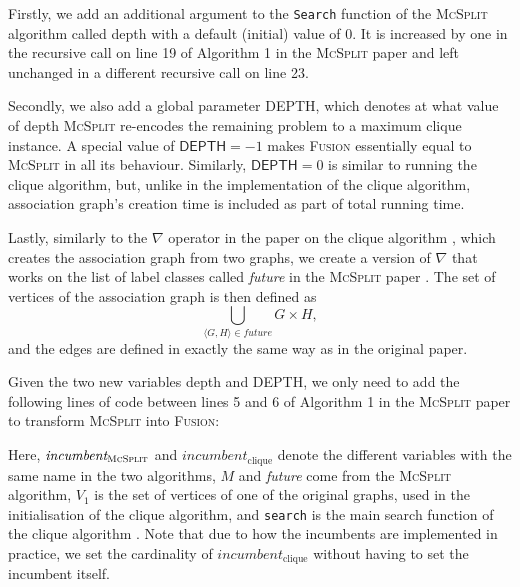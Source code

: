 \documentclass{l4proj}
\theoremstyle{definition}
\theoremstyle{remark}
\begin{document}
Firstly, we add an additional argument to the \texttt{Search} function of the
\textsc{McSplit} algorithm \cite{DBLP:conf/ijcai/McCreeshPT17} called
\textsf{depth} with a default (initial) value of 0. It is increased by one in
the recursive call on line 19 of Algorithm 1 in the \textsc{McSplit} paper
\cite{DBLP:conf/ijcai/McCreeshPT17} and left unchanged in a different recursive
call on line 23.

Secondly, we also add a global parameter \textsf{DEPTH}, which denotes at what value of
\textsf{depth} \textsc{McSplit} re-encodes the remaining problem to a maximum
clique instance. A special value of $\textsf{DEPTH} = -1$ makes \textsc{Fusion}
essentially equal to \textsc{McSplit} in all its behaviour. Similarly,
$\textsf{DEPTH} = 0$ is similar to running the clique algorithm, but, unlike in
the implementation of the clique algorithm, association graph's creation time is
included as part of total running time.

Lastly, similarly to the $\nabla$ operator in the paper on the clique
algorithm \cite{DBLP:conf/cp/McCreeshNPS16}, which creates the association graph
from two graphs, we create a version of $\nabla$ that works on the list of label
classes called \textit{future} in the \textsc{McSplit} paper
\cite{DBLP:conf/ijcai/McCreeshPT17}. The set of vertices of the association
graph is then defined as
\[ \bigcup_{\langle G, H \rangle \in \textit{future}} G \times H, \]
and the edges are defined in exactly the same way as in the original paper.

Given the two new variables \textsf{depth} and \textsf{DEPTH}, we only need to
add the following lines of code between lines 5 and 6 of Algorithm 1 in the
\textsc{McSplit} paper \cite{DBLP:conf/ijcai/McCreeshPT17} to transform
\textsc{McSplit} into \textsc{Fusion}:

\begin{algorithm}
\end{algorithm}

Here, $\textit{incumbent}_{\textsc{McSplit}}$ and
$\textit{incumbent}_{\text{clique}}$ denote the different variables with the
same name in the two algorithms, $M$ and \textit{future} come from the
\textsc{McSplit} algorithm, $V_1$ is the set of vertices of one of the
original graphs, used in the initialisation of the clique algorithm, and
\texttt{search} is the main search function of the clique algorithm
\cite{DBLP:conf/cp/McCreeshNPS16}. Note that due to how the incumbents are
implemented in practice, we set the cardinality of
$\textit{incumbent}_{\text{clique}}$ without having to set the incumbent itself.
\end{document}

